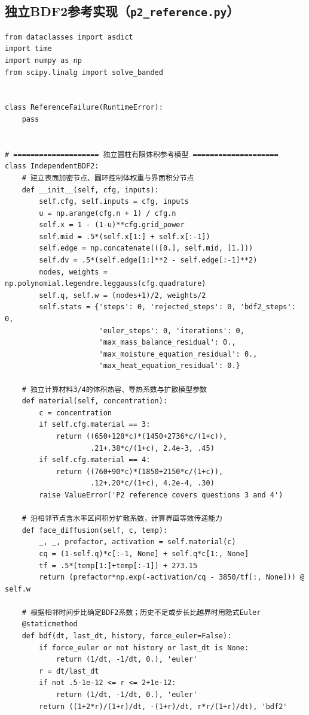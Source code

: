 \subsection{独立BDF2参考实现（\texttt{p2\_reference.py}）}
\begin{Verbatim}[fontsize=\scriptsize,breaklines=true,breakanywhere=true]
from dataclasses import asdict
import time
import numpy as np
from scipy.linalg import solve_banded


class ReferenceFailure(RuntimeError):
    pass


# ==================== 独立圆柱有限体积参考模型 ====================
class IndependentBDF2:
    # 建立表面加密节点、圆环控制体权重与界面积分节点
    def __init__(self, cfg, inputs):
        self.cfg, self.inputs = cfg, inputs
        u = np.arange(cfg.n + 1) / cfg.n
        self.x = 1 - (1-u)**cfg.grid_power
        self.mid = .5*(self.x[1:] + self.x[:-1])
        self.edge = np.concatenate(([0.], self.mid, [1.]))
        self.dv = .5*(self.edge[1:]**2 - self.edge[:-1]**2)
        nodes, weights = np.polynomial.legendre.leggauss(cfg.quadrature)
        self.q, self.w = (nodes+1)/2, weights/2
        self.stats = {'steps': 0, 'rejected_steps': 0, 'bdf2_steps': 0,
                      'euler_steps': 0, 'iterations': 0,
                      'max_mass_balance_residual': 0.,
                      'max_moisture_equation_residual': 0.,
                      'max_heat_equation_residual': 0.}

    # 独立计算材料3/4的体积热容、导热系数与扩散模型参数
    def material(self, concentration):
        c = concentration
        if self.cfg.material == 3:
            return ((650+128*c)*(1450+2736*c/(1+c)),
                    .21+.38*c/(1+c), 2.4e-3, .45)
        if self.cfg.material == 4:
            return ((760+90*c)*(1850+2150*c/(1+c)),
                    .12+.20*c/(1+c), 4.2e-4, .30)
        raise ValueError('P2 reference covers questions 3 and 4')

    # 沿相邻节点含水率区间积分扩散系数，计算界面等效传递能力
    def face_diffusion(self, c, temp):
        _, _, prefactor, activation = self.material(c)
        cq = (1-self.q)*c[:-1, None] + self.q*c[1:, None]
        tf = .5*(temp[1:]+temp[:-1]) + 273.15
        return (prefactor*np.exp(-activation/cq - 3850/tf[:, None])) @ self.w

    # 根据相邻时间步比确定BDF2系数；历史不足或步长比越界时用隐式Euler
    @staticmethod
    def bdf(dt, last_dt, history, force_euler=False):
        if force_euler or not history or last_dt is None:
            return (1/dt, -1/dt, 0.), 'euler'
        r = dt/last_dt
        if not .5-1e-12 <= r <= 2+1e-12:
            return (1/dt, -1/dt, 0.), 'euler'
        return ((1+2*r)/(1+r)/dt, -(1+r)/dt, r*r/(1+r)/dt), 'bdf2'


\end{Verbatim}
